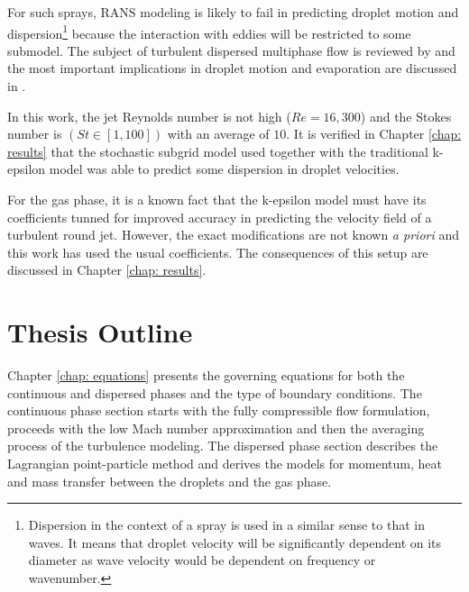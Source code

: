 For such sprays, RANS modeling is likely to fail in predicting droplet motion and dispersion\footnote{Dispersion in the context of a spray is used in a similar sense to that in waves. It means that droplet velocity will be significantly dependent on its diameter as wave velocity would be dependent on frequency or wavenumber. } because the interaction with eddies will be restricted to some submodel.  The subject of turbulent dispersed multiphase flow is reviewed by \cite{balachandar2010turbulent} and the most important implications in droplet motion and evaporation are discussed in \cite{sirignano}.

In this work, the jet Reynolds number is not high ($Re=16,300$) and the Stokes number is $\left( St \in [1,100] \right)$ with an average of $10$. It is verified in Chapter \ref{chap: results} that the stochastic subgrid model used together with the traditional k-epsilon model was able to predict some dispersion in droplet velocities.

For the gas phase, it is a known fact that the k-epsilon model must have its coefficients tunned for improved accuracy in predicting the velocity field of a turbulent round jet. However, the exact modifications are not known \textit{a priori} and this work has used the usual coefficients. The consequences of this setup are discussed in Chapter \ref{chap: results}.



\section{Thesis Outline}

Chapter \ref{chap: equations} presents the governing equations for both the continuous and dispersed phases and the type of boundary conditions.
The continuous phase section starts with the fully compressible flow formulation, proceeds with the low Mach number approximation and then the averaging process of the turbulence modeling. The dispersed phase section describes the Lagrangian point-particle method and derives the models for momentum, heat and mass transfer between the droplets and the gas phase. 

